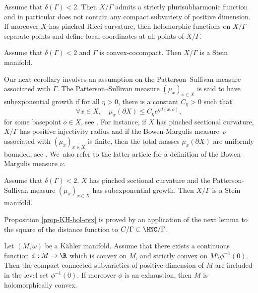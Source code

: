 \begin{proposition}\label{prop-KH-ss-ens}
Assume that $\delta(\Gamma)<2$. Then $X/\Gamma$ admits a strictly plurisubharmonic function and in particular does not contain any compact subvariety of positive dimension. If moreover $X$ has pinched Ricci curvature, then holomorphic functions on $X/\Gamma$ separate points and define local coordinates at all points of $X/\Gamma$.
\end{proposition}

\begin{corollary}\label{cor-cvx+delta:stein}
Assume that $\delta(\Gamma)<2$ and $\Gamma$ is convex-cocompact. Then $X/\Gamma$ is a Stein manifold.
\end{corollary}

Our next corollary involves an assumption on the Patterson--Sullivan measure associated with $\Gamma$. The Patterson--Sullivan measure $(\mu_x)_{x\in X}$ is said to have subexponential growth if for all $\eta>0$, there is a constant $C_{\eta}>0$ such that
\begin{equation*}
\forall x\in X,\quad \mu_x(\partial X) \le C_{\eta}e^{\eta d(x,o)},
\end{equation*}
for some basepoint $o\in X$, see \cite[\S1.4]{connellNaturalFlowCritical2023}. For instance, if $X$ has pinched sectional curvature, $X/\Gamma$ has positive injectivity radius and if the Bowen-Margulis measure~$\nu$ associated with $(\mu_x)_{x\in X}$ is finite, then the total masses $\mu_x(\partial X)$ are uniformly bounded, see \cite[Th.\,1.15]{connellNaturalFlowCritical2023}. We~also refer to the latter article for a definition of the Bowen-Margulis measure $\nu$.

\begin{corollary}\label{cor:delta-croissance-ssexp}
Assume that $\delta(\Gamma)<2$, $X$ has pinched sectional curvature and the Patterson-Sullivan measure $(\mu_x)_{x\in X}$ has subexponential growth. Then $X/\Gamma$ is a Stein manifold.
\end{corollary}

Proposition \ref{prop-KH-hol-cvx} is proved by an application of the next lemma to the square of the distance function to $C/\Gamma\subset\HNC/\Gamma$.

\begin{lemma}\label{lem-cvx-psh}
Let $(M,\omega)$ be a Kähler manifold. Assume that there exists a continuous function $\phi:M\to \R$ which is convex on $M$, and strictly convex on $M\setminus \phi^{-1}(0)$. Then the compact connected subvarieties of positive dimension of $M$ are included in the level set $\phi^{-1}(0)$. If moreover $\phi$ is an exhaustion, then $M$ is holomorphically convex.
\end{lemma}

